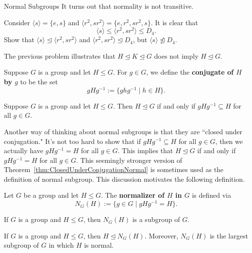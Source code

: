 \begin{section}{Normal Subgroups}
It turns out that normality is not transitive.

\begin{problem}
Consider $\langle s\rangle=\{e,s\}$ and $\langle r^2,sr^2\rangle =\{e,r^2,sr^2,s\}$. It is clear that
\[
\langle s\rangle\leq \langle r^2,sr^2\rangle\leq D_4.
\]
Show that $\langle s\rangle\trianglelefteq \langle r^2,sr^2\rangle$ and $\langle r^2,sr^2\rangle\trianglelefteq D_4$, but $\langle s\rangle\not\trianglelefteq D_4$.
\end{problem}

The previous problem illustrates that $H\trianglelefteq K \trianglelefteq G$ does not imply $H\trianglelefteq G$.

\begin{definition}
Suppose $G$ is a group and let $H\leq G$. For $g\in G$, we define the \textbf{conjugate of $H$ by $g$} to be the set
\[
gHg^{-1}:=\{ghg^{-1}\mid h\in H\}.
\]
\end{definition}

\begin{theorem}\label{thm:ClosedUnderConjugationNormal}
Suppose $G$ is a group and let $H\leq G$.  Then $H\trianglelefteq G$ if and only if $gHg^{-1}\subseteq H$ for all $g\in G$.
\end{theorem}

Another way of thinking about normal subgroups is that they are ``closed under conjugation." It's not too hard to show that if $gHg^{-1}\subseteq H$ for all $g\in G$, then we actually have $gHg^{-1}=H$ for all $g\in G$.  This implies that $H\trianglelefteq G$ if and only if $gHg^{-1}=H$ for all $g\in G$. This seemingly stronger version of Theorem~\ref{thm:ClosedUnderConjugationNormal} is sometimes used as the definition of normal subgroup. This discussion motivates the following definition.

\begin{definition}
Let $G$ be a group and let $H\leq G$.  The \textbf{normalizer of $H$ in $G$} is defined via
\[
N_G(H):=\{g\in G\mid gHg^{-1}=H\}.
\]
\end{definition}

\begin{theorem}
If $G$ is a group and $H\leq G$, then $N_G(H)$ is a subgroup of $G$.
\end{theorem}

\begin{theorem}
If $G$ is a group and $H\leq G$, then $H\trianglelefteq N_G(H)$.  Moreover, $N_G(H)$ is the largest subgroup of $G$ in which $H$ is normal. 
\end{theorem}


\end{section}
